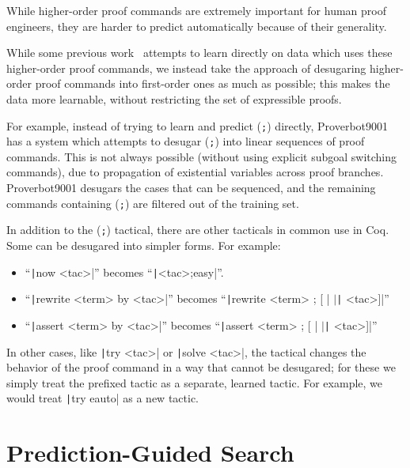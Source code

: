 \documentclass[sigplan,screen]{acmart}
\newcommand{\name}{Proverbot9001\xspace}
\newcommand{\coqinline}[1]{\texttt|#1|}
\renewcommand{\>}{\quad}
\newcommand{\cut}[1]{}
\begin{document}
While higher-order proof commands are extremely important for human proof engineers, they are harder to predict automatically because of their generality.
\cut{Indeed, effectively predicting such higher-order tactics would require learning deeper contextual features.
}
While some previous work~\cite{coqgym} attempts to learn directly on data which uses these higher-order proof commands, we instead take the approach of desugaring higher-order proof commands into first-order ones as much as possible;
this makes the data more learnable, without restricting the set of expressible proofs.


For example, instead of trying to learn and predict (\verb|;|) directly, \name{} has a system which attempts to desugar (\verb-;-) into linear sequences of proof commands.
This is not always possible (without using explicit subgoal switching commands), due to propagation of existential variables across proof branches.
\name{} desugars the cases that can be sequenced, and the remaining commands containing (\verb|;|) are filtered out of the training set.











In addition to the (\verb|;|) tactical,
  there are other tacticals in common use in Coq.
Some can be desugared into simpler forms.
For example:
\begin{itemize}
\item ``\coqinline{now <tac>}'' becomes ``\coqinline{<tac>;easy}''.
\item ``\coqinline{rewrite <term> by <tac>}'' becomes ``\coqinline{rewrite <term> ; [ } $\vert$\coqinline{ <tac>]}''
\item ``\coqinline{assert <term> by <tac>}'' becomes ``\coqinline{assert <term> ; [ } $\vert$\coqinline{ <tac>]}''
\end{itemize}

In other cases, like \coqinline{try <tac>} or \coqinline{solve <tac>},
  the tactical changes the behavior of the proof command in a way that cannot be desugared;
  for these we simply treat the prefixed tactic as a separate, learned tactic.
For example, we would treat \coqinline{try eauto} as a new tactic.

\section{Prediction-Guided Search}
\label{sec:search}
\end{document}
